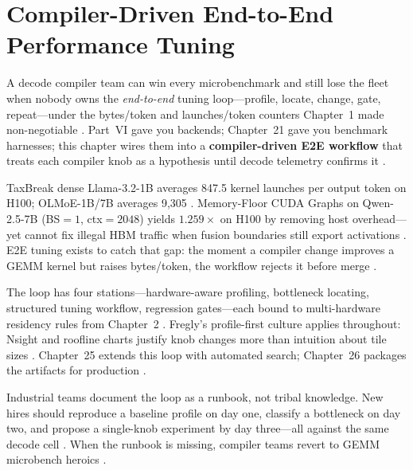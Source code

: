 \chapter{Compiler-Driven End-to-End Performance Tuning}
\label{chap:ch22}

A decode compiler team can win every microbenchmark and still lose the fleet when nobody owns the \emph{end-to-end} tuning loop---profile, locate, change, gate, repeat---under the bytes/token and launches/token counters Chapter~1 made non-negotiable \citep{patel2025llminference,taxbreak2026,memoryfloor2026}. Part~VI gave you backends; Chapter~21 gave you benchmark harnesses; this chapter wires them into a \textbf{compiler-driven E2E workflow} that treats each compiler knob as a hypothesis until decode telemetry confirms it \citep{chen2020compilerbasedhardw,yirage2026,dlbook}.

TaxBreak dense Llama-3.2-1B averages 847.5 kernel launches per output token on H100; OLMoE-1B/7B averages 9,305 \citep{taxbreak2026}. Memory-Floor CUDA Graphs on Qwen-2.5-7B (BS${=}1$, ctx${=}2048$) yields $1.259\times$ on H100 by removing host overhead---yet cannot fix illegal HBM traffic when fusion boundaries still export activations \citep{memoryfloor2026,nvidia2024cudagraphs}. E2E tuning exists to catch that gap: the moment a compiler change improves a GEMM kernel but raises bytes/token, the workflow rejects it before merge \citep{dao2022flashattention,yirage2026,patel2025llminference}.

The loop has four stations---hardware-aware profiling, bottleneck locating, structured tuning workflow, regression gates---each bound to multi-hardware residency rules from Chapter~2 \citep{chen2020compilerbasedhardw,amd2024xdna,amd2024aie,semianalysis2024tma}. Fregly's profile-first culture applies throughout: Nsight and roofline charts justify knob changes more than intuition about tile sizes \citep{patel2025llminference,semianalysis2024tma,memoryfloor2026}. Chapter~25 extends this loop with automated search; Chapter~26 packages the artifacts for production \citep{yirage2026,chen2020compilerbasedhardw,kwon2023vllm,liu2024deepseekv3}.

Industrial teams document the loop as a runbook, not tribal knowledge. New hires should reproduce a baseline profile on day one, classify a bottleneck on day two, and propose a single-knob experiment by day three---all against the same decode cell \citep{patel2025llminference,chen2020compilerbasedhardw,yirage2026,memoryfloor2026,taxbreak2026,dlbook,kwon2023vllm,liu2024deepseekv3,amd2024aie,semianalysis2024tma,amd2024xdna,dao2022flashattention,dao2023flashdecoding,nvidia2024cudagraphs,nvidia2022hopper}. When the runbook is missing, compiler teams revert to GEMM microbench heroics \citep{taxbreak2026,memoryfloor2026,patel2025llminference,yirage2026,chen2020compilerbasedhardw,dlbook,amd2024aie,kwon2023vllm,liu2024deepseekv3,semianalysis2024tma,amd2024xdna,dao2022flashattention,dao2023flashdecoding,nvidia2024cudagraphs,nvidia2022hopper}.

